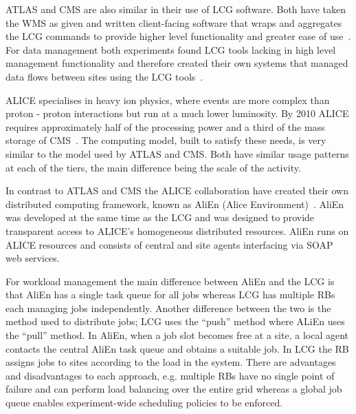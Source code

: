ATLAS and CMS are also similar in their use of LCG software. Both have taken the WMS as given and written client-facing software that wraps and aggregates the LCG commands to provide higher level functionality and greater ease of use~\cite{citeulike:876380, citeulike:912507}. For data management both experiments found LCG tools lacking in high level management functionality and therefore created their own systems that managed data flows between sites using the LCG tools~\cite{citeulike:912497, citeulike:912501}.

ALICE specialises in heavy ion physics, where events are more complex than proton - proton interactions but run at a much lower luminosity. By 2010 ALICE requires approximately half of the processing power and a third of the mass storage of CMS~\cite{LCG_TDR}. The computing model, built to satisfy these needs, is very similar to the model used by ATLAS and CMS. Both have similar usage patterns at each of the tiers, the main difference being the scale of the activity.

In contrast to ATLAS and CMS the ALICE collaboration have created their own distributed computing framework, known as AliEn (Alice Environment)~\cite{citeulike:912514}. AliEn was developed at the same time as the LCG and was designed to provide transparent access to ALICE's homogeneous distributed resources. AliEn runs on ALICE resources and consists of central and site agents interfacing via SOAP web services.


For workload management the main difference between AliEn and the LCG is that AliEn has a single task queue for all jobs whereas LCG has multiple RBs each managing jobs independently. Another difference between the two is the method used to distribute jobs; LCG uses the ``push'' method where ALiEn uses the  ``pull'' method. In AliEn, when a job slot becomes free at a site, a local agent contacts the central AliEn task queue and obtains a suitable job. In LCG the RB assigns jobs to sites according to the load in the system. There are advantages and disadvantages to each approach, e.g. multiple RBs have no single point of failure and can perform load balancing over the entire grid whereas a global job queue enables experiment-wide scheduling policies to be enforced. 

